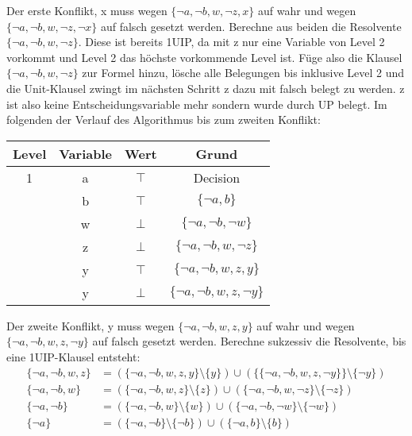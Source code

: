 \documentclass[a4paper,10pt]{article}
\begin{document}
Der erste Konflikt, x muss wegen $\{\neg a, \neg b, w, \neg z, x\}$ auf wahr und wegen $\{\neg a, \neg b, w, \neg z, \neg x\}$ auf falsch gesetzt werden. Berechne aus beiden die Resolvente $\{\neg a, \neg b, w, \neg z\}$. Diese ist bereits 1UIP, da mit z nur eine Variable von Level 2 vorkommt und Level 2 das höchste vorkommende Level ist. Füge also die Klausel $\{\neg a, \neg b, w, \neg z\}$ zur Formel hinzu, lösche alle Belegungen bis inklusive Level 2 und die Unit-Klausel zwingt im nächsten Schritt z dazu mit falsch belegt zu werden. z ist also keine Entscheidungsvariable mehr sondern wurde durch UP belegt. Im folgenden der Verlauf des Algorithmus bis zum zweiten Konflikt:
\begin{center}
\begin{tabular}{|c|c|c|c|}
\hline 
\rule[-1ex]{0pt}{2.5ex} Level & Variable & Wert & Grund \\ 
\hline 
\rule[-1ex]{0pt}{2.5ex} 1 & a & $\top$ & Decision \\ 
\hline 
\rule[-1ex]{0pt}{2.5ex}  & b & $\top$ & $\{\neg a, b\}$ \\ 
\hline 
\rule[-1ex]{0pt}{2.5ex}  & w & $\bot$ & $\{\neg a, \neg b, \neg w\}$ \\ 
\hline 
\rule[-1ex]{0pt}{2.5ex}  & z & $\bot$ & $\{\neg a, \neg b, w, \neg z\}$ \\ 
\hline 
\rule[-1ex]{0pt}{2.5ex}  & y & $\top$ & $\{\neg a, \neg b, w, z, y\}$ \\ 
\hline 
\rule[-1ex]{0pt}{2.5ex}  & y & $\bot$ & $\{\neg a, \neg b, w, z, \neg y\}$ \\ 
\hline 
\end{tabular} 
\end{center}
Der zweite Konflikt, y muss wegen $\{\neg a, \neg b, w, z, y\}$ auf wahr und wegen $\{\neg a, \neg b, w, z, \neg y\}$ auf falsch gesetzt werden. Berechne sukzessiv die Resolvente, bis eine 1UIP-Klausel entsteht:
\begin{align*}
\{\neg a, \neg b, w, z\} & = (\{\neg a, \neg b, w, z, y\} \setminus \{y\}) \cup (\{\{\neg a, \neg b, w, z, \neg y\}\} \setminus \{\neg y\}) \\
\{\neg a, \neg b, w\} & = (\{\neg a, \neg b, w, z\} \setminus \{z\}) \cup (\{\neg a, \neg b, w, \neg z\} \setminus \{\neg z\}) \\
\{\neg a, \neg b\} & = (\{\neg a, \neg b, w\} \setminus \{w\}) \cup (\{\neg a, \neg b, \neg w\} \setminus \{\neg w\}) \\
\{\neg a\} & = (\{\neg a, \neg b\} \setminus \{\neg b\}) \cup (\{\neg a, b\} \setminus \{b\})
\end{align*}
\end{document}
